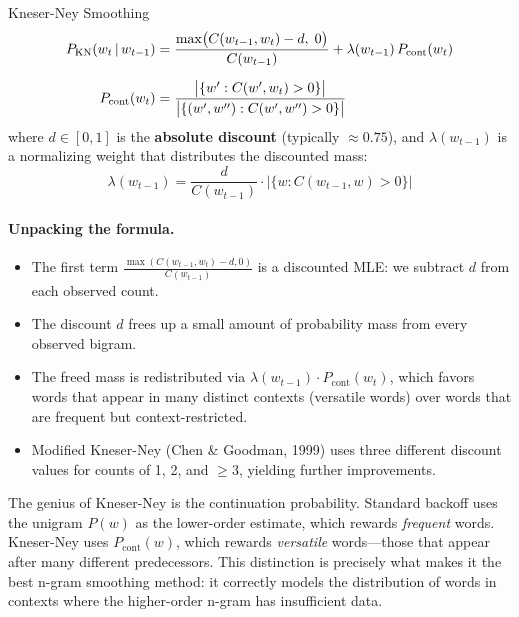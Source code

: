 \begin{mathresult}{Kneser-Ney Smoothing}
\begin{align}
P_{\text{KN}}(w_t \,|\, w_{t-1})
&= \frac{\max\bigl(C(w_{t-1}, w_t) - d,\; 0\bigr)}{C(w_{t-1})}
  + \lambda(w_{t-1})\, P_{\text{cont}}(w_t)
\label{eq:kneser_ney} \\[6pt]
P_{\text{cont}}(w_t)
&= \frac{\bigl|\{w' : C(w', w_t) > 0\}\bigr|}
        {\bigl|\{(w', w'') : C(w', w'') > 0\}\bigr|}
\label{eq:continuation}
\end{align}
where $d \in [0, 1]$ is the \textbf{absolute discount} (typically $\approx 0.75$),
and $\lambda(w_{t-1})$ is a normalizing weight that distributes the discounted
mass:
\begin{equation}
\lambda(w_{t-1}) = \frac{d}{C(w_{t-1})} \cdot \bigl|\{w : C(w_{t-1}, w) > 0\}\bigr|
\label{eq:kn_lambda}
\end{equation}
\end{mathresult}

\paragraph{Unpacking the formula.}
\begin{itemize}
    \item The first term $\frac{\max(C(w_{t-1}, w_t) - d, 0)}{C(w_{t-1})}$
          is a discounted MLE: we subtract $d$ from each observed count.
    \item The discount $d$ frees up a small amount of probability mass from
          every observed bigram.
    \item The freed mass is redistributed via $\lambda(w_{t-1}) \cdot P_{\text{cont}}(w_t)$,
          which favors words that appear in many distinct contexts (versatile words)
          over words that are frequent but context-restricted.
    \item Modified Kneser-Ney (Chen \& Goodman, 1999) uses three different discount
          values for counts of 1, 2, and $\geq 3$, yielding further improvements.
\end{itemize}

\begin{keyinsight}
The genius of Kneser-Ney is the continuation probability.  Standard backoff
uses the unigram $P(w)$ as the lower-order estimate, which rewards \emph{frequent}
words.  Kneser-Ney uses $P_{\text{cont}}(w)$, which rewards \emph{versatile}
words---those that appear after many different predecessors.  This distinction
is precisely what makes it the best n-gram smoothing method: it correctly
models the distribution of words in contexts where the higher-order n-gram
has insufficient data.
\end{keyinsight}


